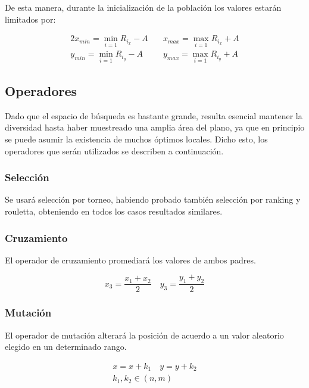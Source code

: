 \documentclass[journal]{IEEEtran}
\begin{document}
De esta manera, durante la inicialización de la población los valores estarán limitados por:

\begin{alignat*}{2}
x_{min} = \min_{i=1} {R_{i_x} - A} &\quad x_{max} = \max_{i=1} {R_{i_x} + A} \\
y_{min} = \min_{i=1} {R_{i_y} - A} &\quad y_{max} = \max_{i=1} {R_{i_y} + A}
\end{alignat*}

\subsection{Operadores}

Dado que el espacio de búsqueda es bastante grande, resulta esencial mantener la diversidad hasta haber muestreado una amplia área del plano, ya que en principio se puede asumir la existencia de muchos óptimos locales. Dicho esto, los operadores que serán utilizados se describen a continuación.\\

\subsubsection{Selección}

Se usará selección por torneo, habiendo probado también selección por ranking y rouletta, obteniendo en todos los casos resultados similares.\\

\subsubsection{Cruzamiento}

El operador de cruzamiento promediará los valores de ambos padres.

$$x_3 = \frac {x_1 + x_2} {2} \quad y_3 = \frac {y_1 + y_2} {2}$$

\subsubsection{Mutación}

El operador de mutación alterará la posición de acuerdo a un valor aleatorio elegido en un determinado rango.

\begin{gather*}
x = x + k_1 \quad y = y + k_2\\
k_1, k_2 \in (n,m)
\end{gather*}
\end{document}
